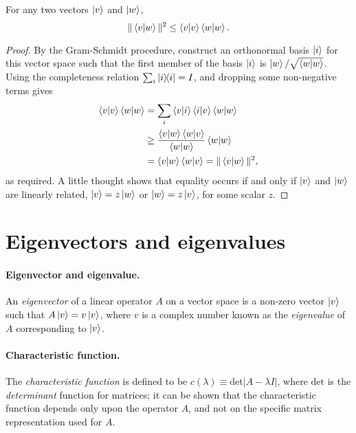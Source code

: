 \begin{theorem}
  For any two vectors $\ket{v}$ and $\ket{w}$, \begin{equation}
    \|\braket{v}{w}\|^2 \leq \braket{v}{v}\braket{w}{w}. \label{eq:cau-sch-ine}
  \end{equation}
\end{theorem}
\begin{proof}
  By the Gram-Schmidt procedure, construct an orthonormal basis $\ket{i}$ for
  this vector space such that the first member of the basis $\ket{i}$ is
  $\ket{w}/\sqrt{\braket{w}{w}}$. Using the completeness relation $\sum_i
  \ketbra{i}{i} = I$, and dropping some non-negative terms gives
  \begin{align*}
    \braket{v}{v}\braket{w}{w}
    &= \sum_i \braket{v}{i}\braket{i}{v} \braket{w}{w} \\
    &\geq \frac{\braket{v}{w}\braket{w}{v}}{\braket{w}{w}} \braket{w}{w} \\
    &= \braket{v}{w}\braket{w}{v} = \|\braket{v}{w}\|^2,
  \end{align*} as required. A little thought shows that equality occurs if and
  only if $\ket{v}$ and $\ket{w}$ are linearly related, $\ket{v} = z\ket{w}$ or
  $\ket{w} = z\ket{v}$, for some scalar $z$.
\end{proof}

\section{Eigenvectors and eigenvalues}

\paragraph{Eigenvector and eigenvalue.} An \emph{eigenvector} of a linear
operator $A$ on a vector space is a non-zero vector $\ket{v}$ such that
$A\ket{v} = v\ket{v}$, where $v$ is a complex number known as the
\emph{eigenvalue} of $A$ corresponding to $\ket{v}$.

\paragraph{Characteristic function.} The \emph{characteristic function} is
defined to be $c(\lambda) \equiv \text{det} |A - \lambda I|$, where
$\text{det}$ is the \emph{determinant} function for matrices; it can be shown
that the characteristic function depends only upon the operator $A$, and not on
the specific matrix representation used for $A$.

